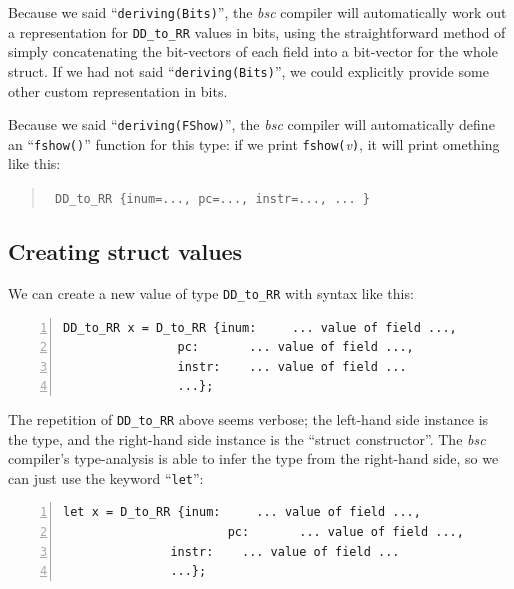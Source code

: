 
Because we said ``\verb|deriving(Bits)|'', the \emph{bsc} compiler
will automatically work out a representation for \verb|DD_to_RR|
values in bits, using the straightforward method of simply
concatenating the bit-vectors of each field into a bit-vector for the
whole struct.  If we had not said ``\verb|deriving(Bits)|'', we could
explicitly provide some other custom representation in bits.


Because we said ``\verb|deriving(FShow)|'', the \emph{bsc} compiler
will automatically define an ``\verb|fshow()|'' function for this
type: if we print \verb|fshow(|\emph{v}\verb|)|, it will print
omething like this:

\begin{quote}\tt
DD\_to\_RR \{inum=..., pc=..., instr=..., ... \}
\end{quote}


\subsection{Creating struct values}


We can create a new value of type \verb|DD_to_RR| with syntax like
this:

\begin{Verbatim}[frame=single, numbers=left]
      DD_to_RR x = D_to_RR {inum:     ... value of field ...,
			    pc:       ... value of field ...,
			    instr:    ... value of field ...
			    ...};
\end{Verbatim}

The repetition of \verb|DD_to_RR| above seems verbose; the left-hand
side instance is the type, and the right-hand side instance is the
``struct constructor''. The \emph{bsc} compiler's type-analysis is
able to infer the type from the right-hand side, so we can just use
the keyword ``\verb|let|'':

\begin{Verbatim}[frame=single, numbers=left]
      let x = D_to_RR {inum:     ... value of field ...,
                       pc:       ... value of field ...,
		       instr:    ... value of field ...
		       ...};
\end{Verbatim}


